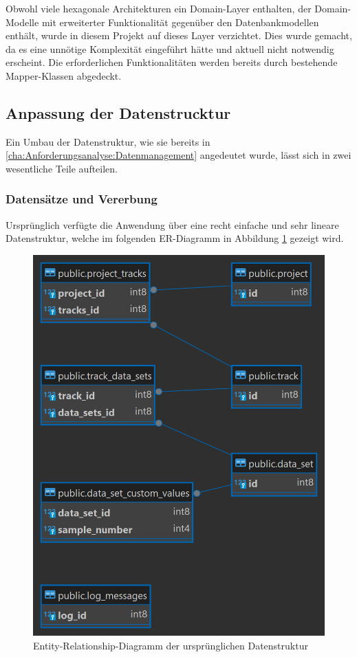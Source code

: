 Obwohl viele hexagonale Architekturen ein Domain-Layer enthalten, der Domain-Modelle mit erweiterter Funktionalität gegenüber den Datenbankmodellen enthält, wurde in diesem Projekt auf dieses Layer verzichtet. Dies wurde gemacht, da es eine unnötige 
Komplexität eingeführt hätte und aktuell nicht notwendig erscheint. Die erforderlichen Funktionalitäten werden bereits durch bestehende Mapper-Klassen abgedeckt.


\subsection*{Anpassung der Datenstrucktur}
Ein Umbau der Datenstruktur, wie sie bereits in \ref{cha:Anforderungsanalyse:Datenmanagement} angedeutet wurde, lässt sich in zwei wesentliche Teile aufteilen.
\subsubsection{Datensätze und Vererbung}
Ursprünglich verfügte die Anwendung über eine recht einfache und sehr lineare Datenstruktur, welche im folgenden ER-Diagramm in Abbildung \ref{fig:datamodel_old_version} gezeigt wird.

\begin{figure}[ht]
    \centering
    \includegraphics[width=1\textwidth]{includes/figures/database/software_old.png}
    \caption{Entity-Relationship-Diagramm der ursprünglichen Datenstruktur}
    \label{fig:datamodel_old_version}
\end{figure}



